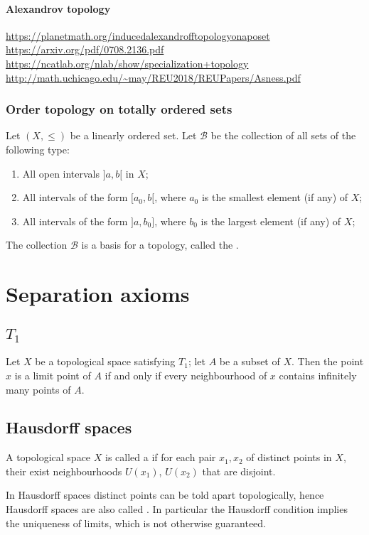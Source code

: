 \paragraph{Alexandrov topology}
\url{https://planetmath.org/inducedalexandrofftopologyonaposet}
\url{https://arxiv.org/pdf/0708.2136.pdf}
\url{https://ncatlab.org/nlab/show/specialization+topology}
\url{http://math.uchicago.edu/~may/REU2018/REUPapers/Asness.pdf}

\subsubsection{Order topology on totally ordered sets}
\begin{definition}
Let $(X,\leq)$ be a linearly ordered set. Let $\mathcal{B}$ be the collection of all sets of the following type:
\begin{enumerate}
\item All open intervals $]a,b[$ in $X$;
\item All intervals of the form $[a_0, b[$, where $a_0$ is the smallest element (if any) of $X$;
\item All intervals of the form $]a, b_0]$, where $b_0$ is the largest element (if any) of $X$;
\end{enumerate}
The collection $\mathcal{B}$ is a basis for a topology, called the .
\end{definition}


\section{Separation axioms}

\subsection{$T_1$}
\begin{proposition}
Let $X$ be a topological space satisfying $T_1$; let $A$ be a subset of $X$.
Then the point $x$ is a limit point of $A$ \textup{if and only if} every neighbourhood of $x$ contains infinitely many points of $A$.
\end{proposition}
\subsection{Hausdorff spaces}
\begin{definition}
A topological space $X$ is called a  if for each pair $x_1, x_2$ of distinct points in $X$, their exist neighbourhoods $U(x_1)$, $U(x_2)$ that are disjoint.
\end{definition}
In Hausdorff spaces distinct points can be told apart topologically, hence Hausdorff spaces are also called . In particular the Hausdorff condition implies the uniqueness of limits, which is not otherwise guaranteed.

